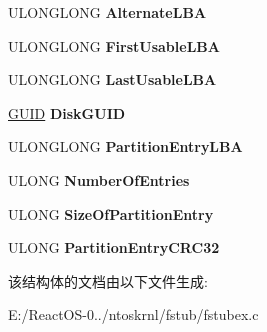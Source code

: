 \begin{DoxyCompactItemize}
U\+L\+O\+N\+G\+L\+O\+NG {\bfseries Alternate\+L\+BA}
\item 
\mbox{\label{struct___e_f_i___p_a_r_t_i_t_i_o_n___h_e_a_d_e_r_a1b2b33f17b02869079853ed7c924f7b8}} 
U\+L\+O\+N\+G\+L\+O\+NG {\bfseries First\+Usable\+L\+BA}
\item 
\mbox{\label{struct___e_f_i___p_a_r_t_i_t_i_o_n___h_e_a_d_e_r_ab8c0c075997b35282d6955cf58d2e100}} 
U\+L\+O\+N\+G\+L\+O\+NG {\bfseries Last\+Usable\+L\+BA}
\item 
\mbox{\label{struct___e_f_i___p_a_r_t_i_t_i_o_n___h_e_a_d_e_r_a11155854b965910863d20ade77614955}} 
\hyperlink{interface_g_u_i_d}{G\+U\+ID} {\bfseries Disk\+G\+U\+ID}
\item 
\mbox{\label{struct___e_f_i___p_a_r_t_i_t_i_o_n___h_e_a_d_e_r_acc424b82c2afc60845618201c2f9079f}} 
U\+L\+O\+N\+G\+L\+O\+NG {\bfseries Partition\+Entry\+L\+BA}
\item 
\mbox{\label{struct___e_f_i___p_a_r_t_i_t_i_o_n___h_e_a_d_e_r_ac3c3d3223aa87b383a34dda678c398ad}} 
U\+L\+O\+NG {\bfseries Number\+Of\+Entries}
\item 
\mbox{\label{struct___e_f_i___p_a_r_t_i_t_i_o_n___h_e_a_d_e_r_ad4466725d3512e760885b5dec395b280}} 
U\+L\+O\+NG {\bfseries Size\+Of\+Partition\+Entry}
\item 
\mbox{\label{struct___e_f_i___p_a_r_t_i_t_i_o_n___h_e_a_d_e_r_acfedb52a387d18445789e291b5369465}} 
U\+L\+O\+NG {\bfseries Partition\+Entry\+C\+R\+C32}
\end{DoxyCompactItemize}


该结构体的文档由以下文件生成\+:\begin{DoxyCompactItemize}
\item 
E\+:/\+React\+O\+S-\/0../ntoskrnl/fstub/fstubex.\+c\end{DoxyCompactItemize}
